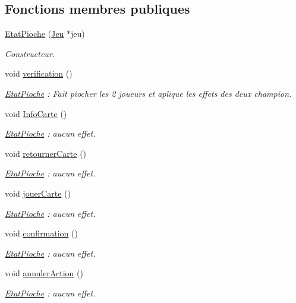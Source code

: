 \subsection*{Fonctions membres publiques}
\begin{DoxyCompactItemize}
\item 
\hyperlink{class_etat_pioche_a7128040b6e05886001252c439eb65c20}{Etat\-Pioche} (\hyperlink{class_jeu}{Jeu} $\ast$jeu)
\begin{DoxyCompactList}\small\item\em Constructeur. \end{DoxyCompactList}\item 
void \hyperlink{class_etat_pioche_af429306bdc936b19982b604a686a230d}{verification} ()
\begin{DoxyCompactList}\small\item\em \hyperlink{class_etat_pioche}{Etat\-Pioche} \-: Fait piocher les 2 joueurs et aplique les effets des deux champion. \end{DoxyCompactList}\item 
void \hyperlink{class_etat_pioche_aa4379e774a3cfa7f3ce7f6668363f04f}{Info\-Carte} ()
\begin{DoxyCompactList}\small\item\em \hyperlink{class_etat_pioche}{Etat\-Pioche} \-: aucun effet. \end{DoxyCompactList}\item 
void \hyperlink{class_etat_pioche_ab139c9695f98b2e45df5fdc8f494ea80}{retourner\-Carte} ()
\begin{DoxyCompactList}\small\item\em \hyperlink{class_etat_pioche}{Etat\-Pioche} \-: aucun effet. \end{DoxyCompactList}\item 
void \hyperlink{class_etat_pioche_a951f62c333a41232cb4c09738925e7db}{jouer\-Carte} ()
\begin{DoxyCompactList}\small\item\em \hyperlink{class_etat_pioche}{Etat\-Pioche} \-: aucun effet. \end{DoxyCompactList}\item 
void \hyperlink{class_etat_pioche_ab3394a63db70d706b48501969edc7880}{confirmation} ()
\begin{DoxyCompactList}\small\item\em \hyperlink{class_etat_pioche}{Etat\-Pioche} \-: aucun effet. \end{DoxyCompactList}\item 
void \hyperlink{class_etat_pioche_a5c22d5a85ff1d59eb5facecee39e960b}{annuler\-Action} ()
\begin{DoxyCompactList}\small\item\em \hyperlink{class_etat_pioche}{Etat\-Pioche} \-: aucun effet. \end{DoxyCompactList}\end{DoxyCompactItemize}



